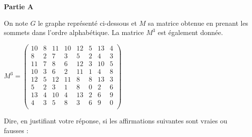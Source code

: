 \documentclass[]{prof}
\begin{document}
\vfill\newpage\null 


\textbf{Partie A}

On note $G$ le graphe représenté ci-dessous et $M$ sa matrice obtenue en prenant les sommets dans l'ordre alphabétique. La matrice $M^3$ est également donnée.

\medskip
\begin{center}
\end{center}

\bigskip
\begin{center}
 $M^3 = \begin{pmatrix}
    10  &   8   &   11  &   10  &   12  &   5   &   13  &   4\\
    8   &   2   &   7   &   3   &   5   &   2   &   4   &   3\\
    11  &   7   &   8   &   6   &   12  &   3   &   10  &   5\\
    10  &   3   &   6   &   2   &   11  &   1   &   4   &   8\\
    12  &   5   &   12  &   11  &   8   &   8   &   13  &   3\\
    5   &   2   &   3   &   1   &   8   &   0   &   2   &   6\\
    13  &   4   &   10  &   4   &   13  &   2   &   6   &   9\\
    4   &   3   &   5   &   8   &   3   &   6   &   9   &   0\\
\end{pmatrix}$
\end{center}


\bigskip
Dire, en justifiant votre réponse, si les affirmations suivantes sont vraies ou  fausses :
\end{document}
